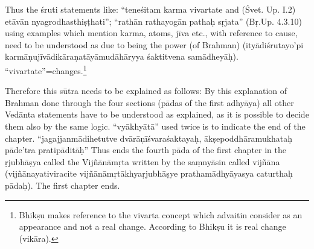 

Thus the śruti statements like: “teneśitam karma vivartate and (Śvet. Up. I.2) etāvān nyagrodhasthiṣṭhati”; “rathān rathayogān pathaḥ sṛjata” (Bṛ.Up. 4.3.10) using examples which mention karma, atoms, jīva etc., with reference to cause, need to be understood as due to being the power (of Brahman) (ityādiśrutayo’pi karmāṇujīvādikāraṇatāyāmudāhāryya śaktitvena samādheyāḥ). “vivartate”=changes.\footnote{Bhikṣu makes reference to the vivarta concept which advaitin consider as an appearance and not a real change. According to Bhikṣu it is real change (vikāra).} 

Therefore this sūtra needs to be explained as follows: By this explanation of Brahman done through the four sections (pādas of the first adhyāya) all other Vedānta statements have to be understood as   explained, as it is possible to decide them also by the same logic. “vyā\-khyātā” used twice is to indicate the end of the chapter. “jagajjanmādihetutve dvārāṇīśvaraśaktayaḥ, ākṣepoddhāramukhataḥ pāde’tra pratipāditāḥ” Thus ends the fourth pāda of the first chapter in the ṛjubhāṣya called the Vijñānāmṛta written by the saṃnyāsin called vijñāna (vijñānayativiracite vijñānāmṛtākhyaṛjubhāṣye prathamādhyā\-yasya caturthaḥ pādaḥ). The first chapter ends.
